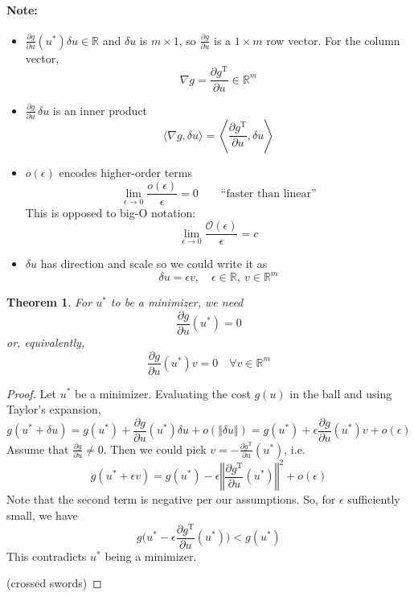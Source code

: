 \documentclass[letterpaper,12pt,titlepage]{report}
\newcommand{\trans}{^\text{T}}
\newcommand*\pder[2]{\frac{\partial #1}{\partial #2}}
\theoremstyle{plain}
\newtheorem*{thm}{Theorem}
\theoremstyle{definition}
\begin{document}
\paragraph{Note:} \mbox{}
\begin{itemize}
\item $\displaystyle \pder{g}{u}(u^*) \delta u \in \mathbb R$ and $\delta u$ is $m\times 1$, so $\displaystyle \pder{g}{u}$ is a $1\times m$ row vector. For the column vector,
  \[ \nabla g = \pder{g\trans}{u} \in \mathbb R^m \]
\item $\displaystyle \pder{g}{u} \, \delta u$ is an inner product
  \[ \langle \nabla g, \delta u \rangle = \left\langle \pder{g\trans}{u}, \delta u \right\rangle \]
\item $o(\epsilon)$ encodes higher-order terms
  \[ \lim_{\epsilon\to 0} \frac{o(\epsilon)}{\epsilon} = 0 \qquad \text{``faster than linear''} \]
  This is opposed to big-O notation:
  \[ \lim_{\epsilon\to 0} \frac{\mathcal O(\epsilon)}{\epsilon} = c \]
\item $\delta u$ has direction and scale so we could write it as
  \[ \delta u = \epsilon v, \quad \epsilon\in\mathbb R,\ v\in\mathbb R^m \]
\end{itemize}

\begin{thm}
  For $u^*$ to be a minimizer, we need
  \[ \pder{g}{u} (u^*) = 0 \]
  or, equivalently,
  \[ \pder{g}{u} (u^*) v = 0 \quad \forall v\in\mathbb R^m \]
\end{thm}

\begin{proof}
  Let $u^*$ be a minimizer. Evaluating the cost $g(u)$ in the ball and using Taylor's expansion,
  \[ g(u^* + \delta u) = g(u^*) + \pder{g}{u} (u^*) \delta u + o(\Vert\delta u\Vert) = g(u^*) + \epsilon \pder{g}{u} (u^*) v + o(\epsilon) \]
  Assume that $\pder{g}{u} \neq 0$. Then we could pick $v=-\pder{g\trans}{u}(u^*)$, i.e.
  \[ g(u^*+\epsilon v) = g(u^*) - \epsilon \left\Vert \pder{g\trans}{u} (u^*) \right\Vert^2 + o(\epsilon) \]
  Note that the second term is negative per our assumptions. So, for $\epsilon$ sufficiently small, we have
  \[ g \Big( u^* - \epsilon\pder{g\trans}{u} (u^*) \Big) < g(u^*) \]
  This contradicts $u^*$ being a minimizer. \quad
  (crossed swords)
\end{proof}
\end{document}
